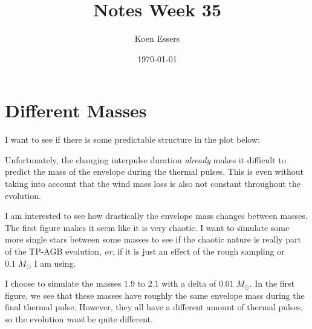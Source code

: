 \documentclass[a4paper,10pt]{article}
\title{Notes Week 35}
\author{Koen Essers}
\date{\today}
\begin{document}
\setuplayout

\section{Different Masses}

I want to see if there is some predictable structure in the plot below:

\begin{figure}[ht]
	\centering
\end{figure}

\begin{figure}[ht]
	\centering
\end{figure}

Unfortunately, the changing interpulse duration \emph{already} makes it difficult to predict the
mass of the envelope during the thermal pulses.
This is even without taking into account that
the wind mass loss is also not constant throughout the evolution.

I am interested to see how drastically the envelope mass changes between masses.
The first figure makes it seem like it is very chaotic.
I want to simulate some more single stars
between some masses to see if the chaotic nature is really part of the TP-AGB evolution, \emph{or}, if it is
just an effect of the rough sampling or \(0.1\; M_\odot \) I am using.

I choose to simulate the masses \(1.9\) to \(2.1\) with a delta of \(0.01\; M_\odot \).
In the first figure,
we see that these masses have roughly the same envelope mass during the final thermal pulse.
However, they all have a different amount of thermal pulses, so the evolution \emph{must} be quite different.
\end{document}
